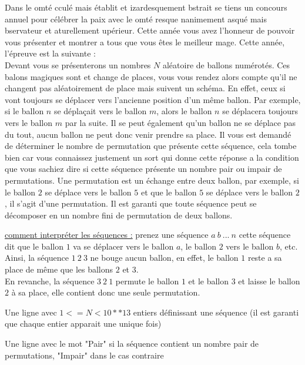 \problemname{\problemyamlname}


\newcommand{\maxn}{10^4}  %

Dans le omté cculé mais établit et izardesquement bstrait se tiens un concours annuel pour célébrer la paix avec le omté resque nanimement asqué mais bservateur et aturellement upérieur.
Cette année vous avez l'honneur de pouvoir vous présenter et montrer a tous que vous êtes le meilleur mage. Cette année, l'épreuve est la suivante : \\

Devant vous se présenterons un nombres $N$ aléatoire de ballons numérotés. Ces balons magiques sont et change de places, vous vous rendez alors compte qu'il ne changent pas aléatoirement de place mais suivent un schéma. En effet, ceux si vont toujours se déplacer vers l'ancienne position d'un même ballon.
Par exemple, si le ballon $n$ se déplaçait vers le ballon $m$, alors le ballon $n$ se déplacera toujours vers le ballon $m$ par la suite. Il se peut également qu'un ballon ne se déplace pas du tout, aucun ballon ne peut donc venir prendre sa place.
Il vous est demandé de déterminer le nombre de permutation que présente cette séquence, cela tombe bien car vous connaissez justement un sort qui donne cette réponse a la condition que vous sachiez dire si cette séquence présente un nombre pair ou impair de permutations.
Une permutation est un échange entre deux ballon, par exemple, si le ballon $2$ se déplace vers le ballon $5$ et que le ballon $5$ se déplace vers le ballon $2$, il s'agit d'une permutation.
Il est garanti que toute séquence peut se décomposer en un nombre fini de permutation de deux ballons.

\underline{comment interpréter les séquences :} prenez une séquence $a\ b\ ...\ n$ cette séquence dit que le ballon $1$ va se déplacer vers le ballon $a$, le ballon $2$ vers le ballon $b$, etc.\\
Ainsi, la séquence $1\ 2\ 3$ ne bouge aucun ballon, en effet, le ballon $1$ reste a sa place de même que les ballons $2$ et $3$.\\
En revanche, la séquence $3\ 2\ 1$ permute le ballon $1$ et le ballon $3$ et laisse le ballon $2$ à sa place, elle contient donc une seule permutation.

\begin{Input}
    \begin{Itemize}
        \item Une ligne avec $1 <= N < 10**13$ entiers définissant une séquence (il est garanti que chaque entier apparait une unique fois)
    \end{Itemize}
\end{Input}

\begin{Output}
    \begin{Itemize}
        \item Une ligne avec le mot "Pair" si la séquence contient un nombre pair de permutations, "Impair" dans le cas contraire
    \end{Itemize}
\end{Output}